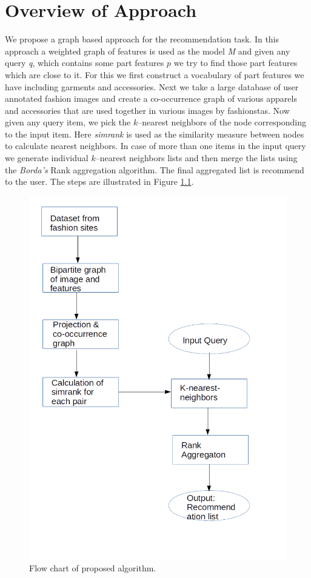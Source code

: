 \chapter{Overview of Approach}

We propose a graph based approach for the recommendation task. In this approach a weighted graph of features is used as the model \emph{\Large{M}} and given any query \emph{q}, which contains some part features $p$ we try to find those part features which are close to it. For this we first construct a vocabulary of part features we have including garments and accessories. Next we take a large database of user annotated fashion images and create a co-occurrence graph of various apparels and accessories that are used together in various images by fashionstas. Now given any query item, we pick the $k$--nearest neighbors of the node corresponding to the input item. Here \textit{simrank}\cite{simrank} is used as the similarity measure between nodes to calculate nearest neighbors. In case of more than one items in the input query we generate individual $k$--nearest neighbors lists and then merge the lists using the \textit{Borda's} Rank aggregation algorithm\cite{rankAggregation}. The final aggregated list is recommend to the user. The steps are illustrated in Figure \ref{fig:flowchart}.
\begin{figure}[htb]
\centering
\includegraphics[scale=0.4]{flowchart}
\caption{Flow chart of proposed algorithm.}
\label{fig:flowchart}
\vskip -6pt
\end{figure}


